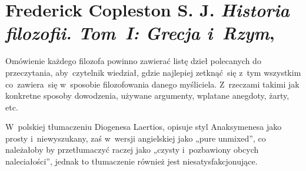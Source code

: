\documentclass[a4paper,11pt]{article}
\numberwithin{equation}{section}
\begin{document}
\VerSpaceTwo




















\section{Frederick Copleston S. J.
  \textit{Historia filozofii. Tom~I: Grecja i~Rzym},
  \cite{CoplestonHistoriaFilozofiiVolI2004}}


\vspace{0em}



\vspace{0em}


\noindent
Omówienie każdego filozofa powinno zawierać listę dzieł
polecanych do przeczytania, aby~czytelnik wiedział, gdzie najlepiej
zetknąć~się z~tym wszystkim co~zawiera~się w~sposobie filozofowania
danego myśliciela. Z~rzeczami takimi jak konkretne sposoby dowodzenia,
używane argumenty, wplatane anegdoty, żarty, etc.

\VerSpaceFour







\noindent
{} W~polskiej tłumaczeniu Diogenesa Laertios, opisuje
styl Anaksymenesa jako prosty i~niewyszukany, zaś w~wersji angielskiej
jako „pure unmixed”, co należałoby by przetłumaczyć raczej jako
„czysty i~pozbawiony obcych naleciałości”, jednak to tłumaczenie
również jest niesatysfakcjonujące.

\VerSpaceFour
\end{document}
